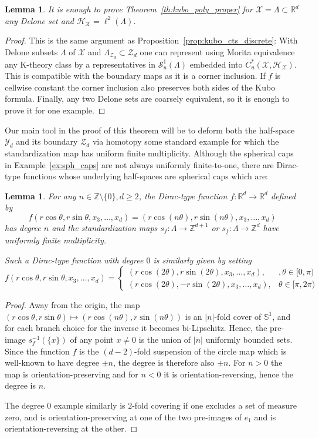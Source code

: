 \documentclass[12pt]{amsart}
\newtheorem{lemma}[theorem]{Lemma}
\newcommand{\RM}{{\mathbb R}}
\newcommand{\SM}{{\mathbb S}}
\newcommand{\ZM}{{\mathbb Z}}
\newcommand{\Ss}{{\mathcal S}}
\newcommand{\Hh}{{\mathcal H}}
\newcommand{\Xx}{{\mathcal X}}
\newcommand{\Yy}{{\mathcal Y}}
\newcommand{\Zz}{{\mathcal Z}}
\begin{document}
\begin{lemma}
\label{lemma:discrete_reduction}
It is enough to prove Theorem~\ref{th:kubo_poly_proper} for $\Xx=\Lambda\subset \RM^d$ any Delone set and $\Hh_\Xx=\ell^2(\Lambda)$.
\end{lemma}
\begin{proof}
This is the same argument as Proposition~\ref{prop:kubo_cts_discrete}: With Delone subsets $\Lambda$ of $\Xx$ and $\Lambda_{\Zz_d}\subset \Zz_d$ one can represent using Morita equivalence any K-theory class by a representatives in $\Ss^1_u(\Lambda)$ embedded into $C^*_u(\Xx,\Hh_\Xx)$. This is compatible with the boundary maps as it is a corner inclusion. If $f$ is cellwise constant the corner inclusion also preserves both sides of the Kubo formula. Finally, any two Delone sets are coarsely equivalent, so it is enough to prove it for one example.
\end{proof}
Our main tool in the proof of this theorem will be to deform both the half-space $\Yy_d$ and its boundary $\Zz_d$ via homotopy some standard example for which the standardization map has uniform finite multiplicity.
Although the spherical caps in Example~\ref{ex:sph_caps} are not always uniformly finite-to-one, there are Dirac-type functions whose underlying half-spaces are spherical caps which are:
\begin{lemma}
\label{lemma:finite_mult}
For any $n\in \ZM \setminus \{0\}, d \geq 2$, the Dirac-type function $f:\RM^d\to \RM^d$ defined by 
\[f(r  \cos\theta,r\sin\theta,x_3,\ldots, x_d)=(r\cos(n\theta), r\sin(n\theta), x_3, \ldots, x_d)\] 
has degree $n$ and the standardization maps $s_f:\Lambda \to \ZM^{d+1}$ or $s_{\underline{f}}:\Lambda \to \ZM^{d}$ have uniformly finite multiplicity.

Such a Dirac-type function with degree $0$ is similarly given by setting
\[f(r  \cos\theta,r\sin\theta,x_3,\dots, x_d)=\begin{cases}
    (r\cos(2\theta), r\sin(2\theta), x_3, \dots, x_d), &, \theta \in [0,\pi)\\
    (r\cos(2\theta), -r\sin(2\theta), x_3, \dots, x_d), & \theta \in [\pi,2\pi)
\end{cases}\]

\end{lemma}
\begin{proof}
Away from the origin, the map $(r  \cos\theta,r\sin\theta)\mapsto (r\cos(n\theta), r\sin(n\theta))$ is an $|n|$-fold cover of $\SM^{1}$, and for each branch choice for the inverse it becomes bi-Lipschitz. Hence, the pre-image $s_f^{-1}(\{x\})$ of any point $x\neq 0$ is the union of $|n|$ uniformly bounded sets. 
Since the function $f$ is the $(d-2)$-fold suspension of the circle map which is well-known to have degree $\pm n$, the degree is therefore also $\pm n$. For $n>0$ the map is orientation-preserving and for $n<0$ it is orientation-reversing, hence the degree is $n$. 

The degree $0$ example similarly is $2$-fold covering if one excludes a set of measure zero, and is orientation-preserving at one of the two pre-images of $e_1$ and is orientation-reversing at the other.
\end{proof}
\end{document}

